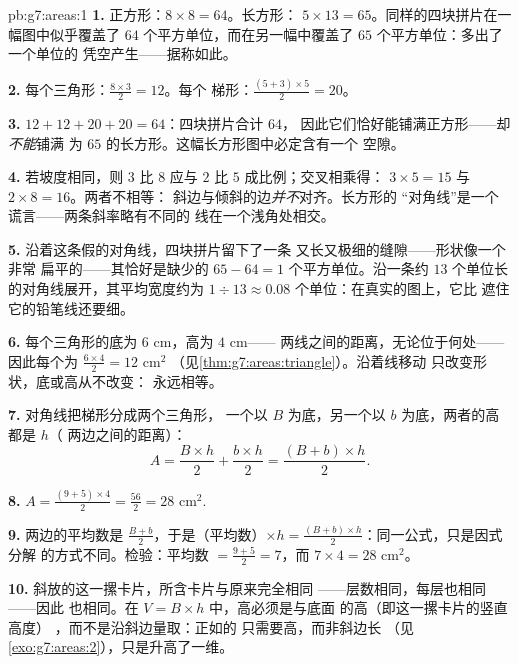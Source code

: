 \begin{solution}{pb:g7:areas:1}
\textbf{1.} 正方形：$8 \times 8 = 64$。长方形：
$5 \times 13 = 65$。同样的四块拼片在一幅图中似乎覆盖了 $64$
个平方单位，而在另一幅中覆盖了 $65$ 个平方单位：多出了一个单位的
凭空产生——据称如此。

\textbf{2.} 每个三角形：$\frac{8 \times 3}{2} = 12$。每个
梯形：$\frac{(5 + 3) \times 5}{2} = 20$。

\textbf{3.} $12 + 12 + 20 + 20 = 64$：四块拼片合计 $64$，
因此它们恰好能铺满正方形——却\emph{不能}铺满
为 $65$ 的长方形。这幅长方形图中必定含有一个
空隙。

\textbf{4.} 若坡度相同，则 $3$ 比 $8$
应与 $2$ 比 $5$ 成比例；交叉相乘得：
$3 \times 5 = 15$ 与 $2 \times 8 = 16$。两者不相等：
斜边与倾斜的边\emph{并不}对齐。长方形的
“对角线”是一个谎言——两条斜率略有不同的
线在一个浅角处相交。

\textbf{5.} 沿着这条假的对角线，四块拼片留下了一条
又长又极细的缝隙——形状像一个非常
扁平的——其恰好是缺少的
$65 - 64 = 1$ 个平方单位。沿一条约
$13$ 个单位长的对角线展开，其平均宽度约为
$1 \div 13 \approx 0.08$ 个单位：在真实的图上，它比
遮住它的铅笔线还要细。

\textbf{6.} 每个三角形的底为 $6$ cm，高为 $4$ cm——
两线之间的距离，无论位于何处——
因此每个为 $\frac{6 \times 4}{2} = 12$ cm$^2$
（见\cref{thm:g7:areas:triangle}）。沿着线移动
只改变形状，底或高从不改变：
永远相等。

\textbf{7.} 对角线把梯形分成两个三角形，
一个以 $B$ 为底，另一个以 $b$ 为底，两者的高都是 $h$（
两边之间的距离）：
\[
A = \frac{B \times h}{2} + \frac{b \times h}{2}
= \frac{(B + b) \times h}{2} .
\]

\textbf{8.} $A = \frac{(9 + 5) \times 4}{2} = \frac{56}{2} =
28$ cm$^2$.

\textbf{9.} 两边的平均数是
$\frac{B + b}{2}$，于是（平均数）$\times h =
\frac{(B+b) \times h}{2}$：同一公式，只是因式分解
的方式不同。检验：平均数 $= \frac{9+5}{2} = 7$，而
$7 \times 4 = 28$ cm$^2$。

\textbf{10.} 斜放的这一摞卡片，所含卡片与原来完全相同
——层数相同，每层也相同——因此
也相同。在 $V = B \times h$ 中，高必须是与底面
\emph{}的高（即这一摞卡片的竖直高度）
，而不是沿斜边量取：正如的
只需要高，而非斜边长
（见\cref{exo:g7:areas:2}），只是升高了一维。


\end{solution}
